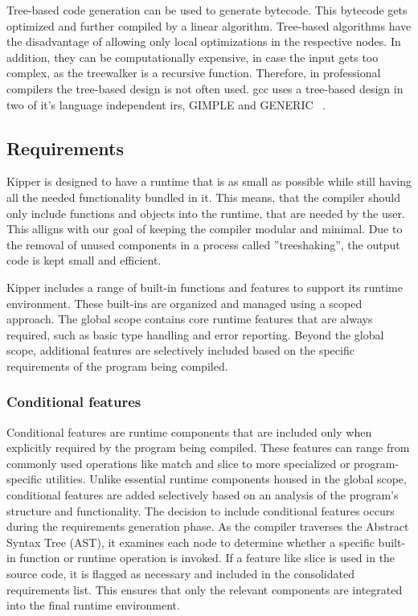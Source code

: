 Tree-based code generation can be used to generate bytecode. This bytecode gets optimized and further compiled by a linear algorithm. Tree-based algorithms have the disadvantage of allowing only local optimizations in the respective nodes. In addition, they can be computationally expensive, in case the input gets too complex, as the treewalker is a recursive function. Therefore, in professional compilers the tree-based design is not often used. \acrshort{gcc} uses a tree-based design in two of it's language independent \acrshort{ir}s, GIMPLE and GENERIC ~\cite{gcc:gimpletuples}.

\subsection{Requirements}
\label{sec:requirements}
Kipper is designed to have a runtime that is as small as possible while still having all the needed functionality bundled in it. This means, that the compiler should only include functions and objects into the runtime, that are needed by the user. This alligns with our goal of keeping the compiler modular and minimal. Due to the removal of unused components in a process called ''treeshaking'', the output code is kept small and efficient.

Kipper includes a range of built-in functions and features to support its runtime environment. These built-ins are organized and managed using a scoped approach. The global scope contains core runtime features that are always required, such as basic type handling and error reporting. Beyond the global scope, additional features are selectively included based on the specific requirements of the program being compiled.

\subsubsection{Conditional features}
Conditional features are runtime components that are included only when explicitly required by the program being compiled. These features can range from commonly used operations like match and slice to more specialized or program-specific utilities. Unlike essential runtime components housed in the global scope, conditional features are added selectively based on an analysis of the program's structure and functionality. The decision to include conditional features occurs during the requirements generation phase. As the compiler traverses the Abstract Syntax Tree (AST), it examines each node to determine whether a specific built-in function or runtime operation is invoked. If a feature like slice is used in the source code, it is flagged as necessary and included in the consolidated requirements list. This ensures that only the relevant components are integrated into the final runtime environment.

